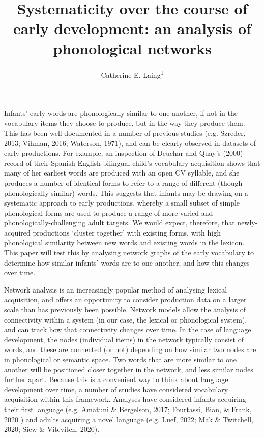 \documentclass[
  man]{apa6}
\title{Systematicity over the course of early development: an analysis of phonological networks}
\author{Catherine E. Laing\textsuperscript{1}}
\date{}
\affiliation{\vspace{0.5cm}\textsuperscript{1} University of York, York, UK}
\begin{document}
\maketitle

Infants' early words are phonologically similar to one another, if not in the vocabulary items they choose to produce, but in the way they produce them. This has been well-documented in a number of previous studies (e.g. Szreder, 2013; Vihman, 2016; Waterson, 1971), and can be clearly observed in datasets of early productions. For example, an inspection of Deuchar and Quay's (2000) record of their Spanish-English bilingual child's vocabulary acquisition shows that many of her earliest words are produced with an open CV syllable, and she produces a number of identical forms to refer to a range of different (though phonologically-similar) words. This suggests that infants may be drawing on a systematic approach to early productions, whereby a small subset of simple phonological forms are used to produce a range of more varied and phonologically-challenging adult targets. We would expect, therefore, that newly-acquired productions `cluster together' with existing forms, with high phonological similarity between new words and existing words in the lexicon. This paper will test this by analysing network graphs of the early vocabulary to determine how similar infants' words are to one another, and how this changes over time.

Network analysis is an increasingly popular method of analysing lexical acquisition, and offers an opportunity to consider production data on a larger scale than has previously been possible. Network models allow the analysis of connectivity within a system (in our case, the lexical or phonological system), and can track how that connectivity changes over time. In the case of language development, the nodes (individual items) in the network typically consist of words, and these are connected (or not) depending on how similar two nodes are in phonological or semantic space. Two words that are more similar to one another will be positioned closer together in the network, and less similar nodes further apart. Because this is a convenient way to think about language development over time, a number of studies have considered vocabulary acquisition within this framework. Analyses have considered infants acquiring their first language (e.g. Amatuni \& Bergelson, 2017; Fourtassi, Bian, \& Frank, 2020 ) and adults acquiring a novel language (e.g. Luef, 2022; Mak \& Twitchell, 2020; Siew \& Vitevitch, 2020).
\end{document}
